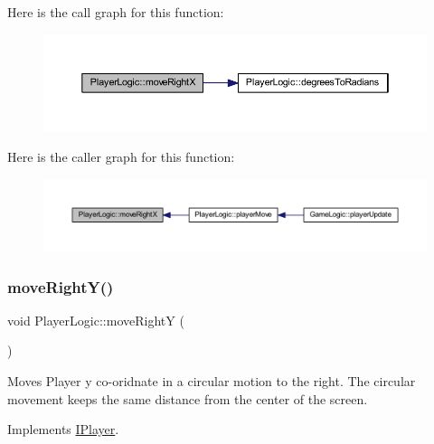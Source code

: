 Here is the call graph for this function\+:\nopagebreak
\begin{figure}[H]
\begin{center}
\leavevmode
\includegraphics[width=350pt]{class_player_logic_a9c96291506bb5347f2c503bba4100fd4_cgraph}
\end{center}
\end{figure}
Here is the caller graph for this function\+:
\nopagebreak
\begin{figure}[H]
\begin{center}
\leavevmode
\includegraphics[width=350pt]{class_player_logic_a9c96291506bb5347f2c503bba4100fd4_icgraph}
\end{center}
\end{figure}
\mbox{\label{class_player_logic_a4b77bba06ba630f974aaa85306109485}} 
\subsubsection{\texorpdfstring{move\+Right\+Y()}{moveRightY()}}
{\footnotesize\ttfamily void Player\+Logic\+::move\+RightY (\begin{DoxyParamCaption}{ }\end{DoxyParamCaption})\hspace{0.3cm}{\ttfamily [virtual]}}



Moves Player y co-\/oridnate in a circular motion to the right. The circular movement keeps the same distance from the center of the screen. 



Implements \hyperlink{class_i_player_ae0c49a2900ebbfa951f24bc1bf4bb382}{I\+Player}.

